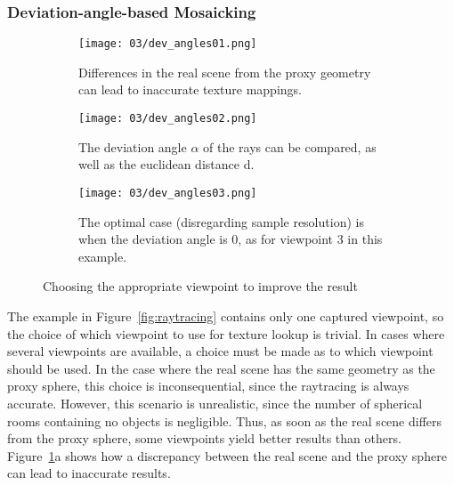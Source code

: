 


\subsubsection{Deviation-angle-based Mosaicking}
\begin{figure}
\centering
    \hfill
    \begin{subfigure}[t]{0.3\textwidth}            
            \centering
            \texttt{[image: 03/dev\_angles01.png]}
            \caption{Differences in the real scene from the proxy geometry can lead to inaccurate texture mappings.}
    \end{subfigure}%
    \hfill
    \begin{subfigure}[t]{0.3\textwidth}
            \centering
            \texttt{[image: 03/dev\_angles02.png]}
            \caption{The deviation angle $\alpha$ of the rays can be compared, as well as the euclidean distance d.}
    \end{subfigure}
    \hfill
    \begin{subfigure}[t]{0.3\textwidth}
            \centering
            \texttt{[image: 03/dev\_angles03.png]}
            \caption{The optimal case (disregarding sample resolution) is when the deviation angle is 0, as for viewpoint 3 in this example.}
    \end{subfigure}
    \hfill
    \caption[Choosing the appropriate viewpoint for texture lookup]{Choosing the appropriate viewpoint to improve the result} \label{fig:dev_angle}
\end{figure}

The example in Figure~\ref{fig:raytracing} contains only one captured viewpoint, so the choice of which viewpoint to use for texture lookup is trivial. In cases where several viewpoints are available, a choice must be made as to which viewpoint should be used. In the case where the real scene has the same geometry as the proxy sphere, this choice is inconsequential, since the raytracing is always accurate. However, this scenario is unrealistic, since the number of spherical rooms containing no objects is negligible. Thus, as soon as the real scene differs from the proxy sphere, some viewpoints yield better results than others. Figure~\ref{fig:dev_angle}a shows how a discrepancy between the real scene and the proxy sphere can lead to inaccurate results.

